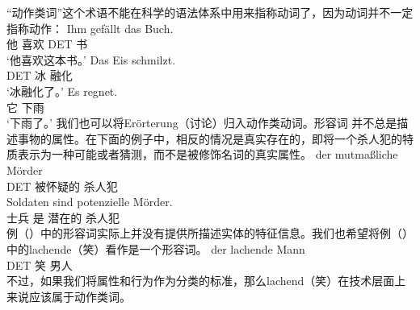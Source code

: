 “动作类词”这个术语不能在科学的语法体系中用来指称动词了，因为动词并不一定指称动作：
\eal
\ex
\gll Ihm gefällt das Buch.\\
	 他 喜欢 DET 书\\
\glt `他喜欢这本书。'
\ex 
\gll Das Eis schmilzt.\\
	 DET 冰  融化\\
\glt `冰融化了。'
\ex 
\gll Es regnet.\\
	 它 下雨\\
\glt `下雨了。'
\zl
我们也可以将Erörterung（讨论）归入动作类动词。形容词  并不总是描述事物的属性。在下面的例子中，相反的情况是真实存在的，即将一个杀人犯的特质表示为一种可能或者猜测，而不是被修饰名词的真实属性。
\eal
\ex 
\gll der mutmaßliche Mörder\\
     DET 被怀疑的 杀人犯\\
\ex 
\gll Soldaten sind potenzielle Mörder.\\
     士兵 是 潜在的 杀人犯\\
\zl
例（）中的形容词实际上并没有提供所描述实体的特征信息。我们也希望将例（）中的lachende（笑）看作是一个形容词。
\ea
\gll der lachende Mann\\
	 DET 笑 男人\\
\z
不过，如果我们将属性和行为作为分类的标准，那么lachend（笑）在技术层面上来说应该属于动作类词。

